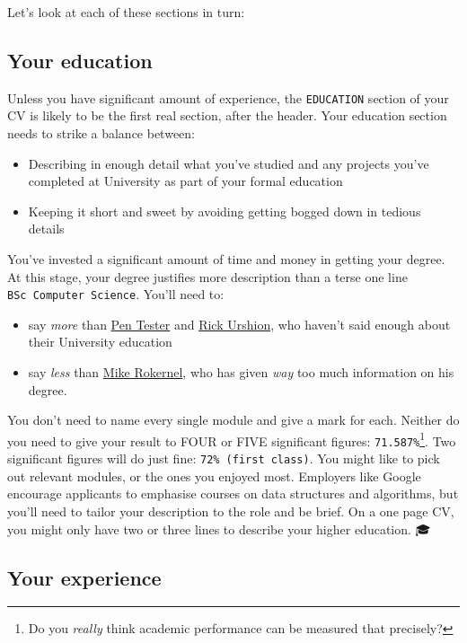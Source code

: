 \documentclass[
]{book}
\providecommand{\tightlist}{%
  \setlength{\itemsep}{0pt}\setlength{\parskip}{0pt}}
\begin{document}
Let's look at each of these sections in turn:

\hypertarget{mycved}{%
\subsection{Your education}\label{mycved}}

Unless you have significant amount of experience, the \texttt{EDUCATION} section of your CV is likely to be the first real section, after the header. Your education section needs to strike a balance between:

\begin{itemize}
\tightlist
\item
  Describing in enough detail what you've studied and any projects you've completed at University as part of your formal education
\item
  Keeping it short and sweet by avoiding getting bogged down in tedious details
\end{itemize}

You've invested a significant amount of time and money in getting your degree. At this stage, your degree justifies more description than a terse one line \texttt{BSc\ Computer\ Science}. You'll need to:

\begin{itemize}
\tightlist
\item
  say \emph{more} than \href{Penelope_Tester.pdf}{Pen Tester} and \href{Rick_Urshion.pdf}{Rick Urshion}, who haven't said enough about their University education
\item
  say \emph{less} than \href{Mike_Rokernel.pdf}{Mike Rokernel}, who has given \emph{way} too much information on his degree.
\end{itemize}

You don't need to name every single module and give a mark for each. Neither do you need to give your result to FOUR or FIVE significant figures: \texttt{71.587\%}\footnote{Do you \emph{really} think academic performance can be measured that precisely?}. Two significant figures will do just fine: \texttt{72\%\ (first\ class)}. You might like to pick out relevant modules, or the ones you enjoyed most. Employers like Google encourage applicants to emphasise courses on data structures and algorithms, but you'll need to tailor your description to the role and be brief. On a one page CV, you might only have two or three lines to describe your higher education. 🎓

\hypertarget{mycvex}{%
\subsection{Your experience}\label{mycvex}}
\end{document}
